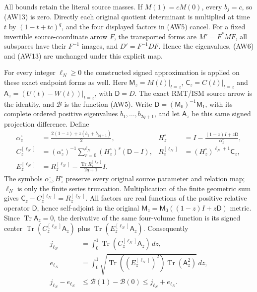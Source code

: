 All bounds retain the literal source masses. If $M(1)=cM(0)$,
every $b_j=c$, so (AW13) is zero. Directly each original
quotient determinant is multiplied at time $t$ by
$(1-t+tc)^q$, and the four displayed factors in (AW5) cancel.
For a fixed invertible source-coordinate arrow $F$, the transported
forms are $M'=F^*MF$, all subspaces have their $F^{-1}$ images,
and $D'=F^{-1}DF$. Hence the eigenvalues, (AW6) and (AW13)
are unchanged under this explicit map.


For every integer $\ell_N\ge0$ the constructed signed approximation
is applied on these exact endpoint forms as well. Here $\mathsf M_z=M(t)|_{t=z}$,
$\mathsf C_z=C(t)|_{t=z}$ and
$\mathsf A_z=(U(t)-W(t))|_{t=z}$, with $\mathsf D=D$.
The exact RMT/ISM source arrow is the identity,
and $\mathcal B$ is the function (AW5).
Write $\mathsf D=(\mathsf M_0)^{-1}\mathsf M_1$, with its complete
ordered positive eigenvalues $b_1,\ldots,b_{2q+1}$, and let
$\mathsf A_z$ be this same signed projection difference. Define
\[
 \begin{aligned}
 \alpha_z^\circ&=\frac{2(1-z)+z(b_1+b_{2q+1})}{2},&
 H_z^\circ&=I-\frac{(1-z)I+z\mathsf D}{\alpha_z^\circ},\\
 C_z^{[\ell_N]}&=(\alpha_z^\circ)^{-1}
       \sum_{r=0}^{\ell_N}(H_z^\circ)^r(\mathsf D-I),&
 R_z^{[\ell_N]}&=(H_z^\circ)^{\ell_N+1}\mathsf C_z,\\
 E_z^{[\ell_N]}&=R_z^{[\ell_N]}
          -\frac{\operatorname{Tr}R_z^{[\ell_N]}}{2q+1}I .
 \end{aligned}
 \tag{AW17aa}
\]
The symbols $\alpha_z^\circ,H_z^\circ$ preserve every original
source parameter and relation map; $\ell_N$ is only the finite
series truncation. Multiplication of the finite geometric sum
gives $\mathsf C_z-C_z^{[\ell_N]}=R_z^{[\ell_N]}$.
All factors are real functions of the positive relative
operator $\mathsf D$, hence self-adjoint in the original
$\mathsf M_z=\mathsf M_0((1-z)I+z\mathsf D)$ metric.
Since $\operatorname{Tr}\mathsf A_z=0$, the derivative of the same
four-volume function is its signed center
$\operatorname{Tr}(C_z^{[\ell_N]}\mathsf A_z)$ plus
$\operatorname{Tr}(E_z^{[\ell_N]}\mathsf A_z)$.
Consequently
\[
 \begin{aligned}
 j_{\ell_N}&=\int_0^1
       \operatorname{Tr}(C_z^{[\ell_N]}\mathsf A_z)\,dz,\\
 e_{\ell_N}&=\int_0^1
       \sqrt{\operatorname{Tr}((E_z^{[\ell_N]})^2)
                     \operatorname{Tr}(\mathsf A_z^2)}\,dz,\\
 j_{\ell_N}-e_{\ell_N}
 &\le\mathcal B(1)-\mathcal B(0)\le j_{\ell_N}+e_{\ell_N}.
 \end{aligned}
 \tag{AW17ab}
\]
